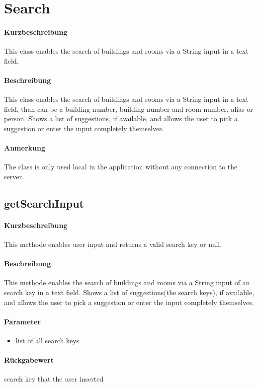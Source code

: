 \section{Search}
\paragraph*{Kurzbeschreibung}
This class enables the search of buildings and rooms via a String input in a text field.
\paragraph*{Beschreibung}
This class enables the search of buildings and rooms via a String input in a text field, 
than can be a building number, building number and room number, alias or person.
Shows a list of suggestions, if available, and allows the user to pick a suggestion or enter the input completely themselves.
\paragraph*{Anmerkung}
The class is only used local in the application without any connection to the server.

\subsection{getSearchInput}%
\paragraph*{Kurzbeschreibung}
This methode enables user input and returns a valid search key or null.
\paragraph*{Beschreibung}
This methode enables the search of buildings and rooms via a String input of an search key in a text field.
Shows a list of suggestions(the search keys), if available, and allows the user to pick a suggestion or enter the input completely themselves.
\paragraph*{Parameter}
\begin{itemize}
    \item list of all search keys
\end{itemize}
\paragraph*{Rückgabewert}
search key that the user inserted
